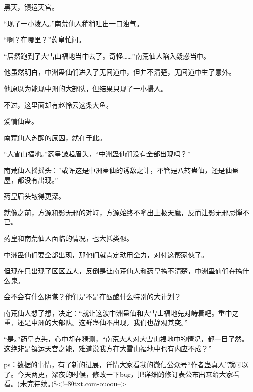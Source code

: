 \begin{this_body}
黑天，镇运天宫。

“现了一小拨人。”南荒仙人稍稍吐出一口浊气。

“啊？在哪里？”药皇忙问。

“居然跑到了大雪山福地当中去了。奇怪……”南荒仙人陷入疑惑当中。

他虽然明白，中洲蛊仙们进入了无间道中，但并不清楚，无间道中生了意外。

他原以为能现中洲的大部队，但结果只现了一小撮人。

不过，这里面却有赵怜云这条大鱼。

爱情仙蛊。

南荒仙人苏醒的原因，就在于此。

“大雪山福地。”药皇皱起眉头，“中洲蛊仙们没有全部出现吗？”

南荒仙人摇摇头：“或许这是中洲蛊仙的诱敌之计，不管是八转蛊仙，还是仙蛊屋，都没有出现。”

药皇眉头皱得更深。

就像之前，方源和影无邪的对峙，方源始终不拿出上极天鹰，反而让影无邪忌惮不已。

药皇和南荒仙人面临的情况，也大抵类似。

中洲蛊仙们要全部出现，那他们就肯定动用全力，对付这帮家伙了。

但现在只出现了区区五人，反倒是让南荒仙人和药皇搞不清楚，中洲蛊仙们在搞什么鬼。

会不会有什么阴谋？他们是不是在酝酿什么特别的大计划？

南荒仙人想了想，决定：“就让这波中洲蛊仙和大雪山福地先对峙着吧。重中之重，还是中洲的大部队。这群蛊仙不出现，我们也静观其变。”

“是。”药皇点头，心中却在猜测，“南荒大人对大雪山福地中的情况，都一目了然。这绝非是镇运天宫之能，难道说我方在大雪山福地中也有内应不成？”

ps：数据的事情，有了新的进展，详情大家看我的微信公众号“作者蛊真人”就可以了。今天两更，深夜的时候，修改一下bug，把详细的修订表公布出来给大家看看。(未完待续。)8<!--80txt.com-ouoou-->

\end{this_body}

